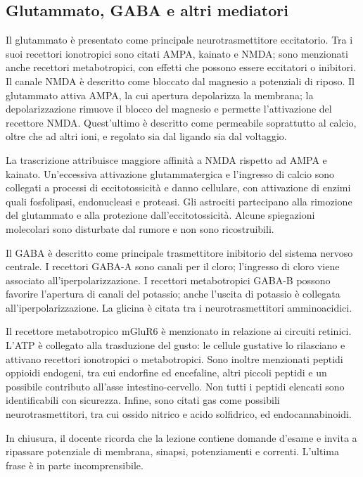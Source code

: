 \subsection{Glutammato, GABA e altri mediatori}

Il glutammato è presentato come principale neurotrasmettitore eccitatorio. Tra i suoi recettori ionotropici sono citati AMPA, kainato e NMDA; sono menzionati anche recettori metabotropici, con effetti che possono essere eccitatori o inibitori. Il canale NMDA è descritto come bloccato dal magnesio a potenziali di riposo. Il glutammato attiva AMPA, la cui apertura depolarizza la membrana; la depolarizzazione rimuove il blocco del magnesio e permette l'attivazione del recettore NMDA. Quest'ultimo è descritto come permeabile soprattutto al calcio, oltre che ad altri ioni, e regolato sia dal ligando sia dal voltaggio.

La trascrizione attribuisce maggiore affinità a NMDA rispetto ad AMPA e kainato. Un'eccessiva attivazione glutammatergica e l'ingresso di calcio sono collegati a processi di eccitotossicità e danno cellulare, con attivazione di enzimi quali fosfolipasi, endonucleasi e proteasi. Gli astrociti partecipano alla rimozione del glutammato e alla protezione dall'eccitotossicità. Alcune spiegazioni molecolari sono disturbate dal rumore e non sono ricostruibili.

Il GABA è descritto come principale trasmettitore inibitorio del sistema nervoso centrale. I recettori GABA-A sono canali per il cloro; l'ingresso di cloro viene associato all'iperpolarizzazione. I recettori metabotropici GABA-B possono favorire l'apertura di canali del potassio; anche l'uscita di potassio è collegata all'iperpolarizzazione. La glicina è citata tra i neurotrasmettitori amminoacidici.

Il recettore metabotropico mGluR6 è menzionato in relazione ai circuiti retinici. L'ATP è collegato alla trasduzione del gusto: le cellule gustative lo rilasciano e attivano recettori ionotropici o metabotropici. Sono inoltre menzionati peptidi oppioidi endogeni, tra cui endorfine ed encefaline, altri piccoli peptidi e un possibile contributo all'asse intestino-cervello. Non tutti i peptidi elencati sono identificabili con sicurezza. Infine, sono citati gas come possibili neurotrasmettitori, tra cui ossido nitrico e acido solfidrico, ed endocannabinoidi.

In chiusura, il docente ricorda che la lezione contiene domande d'esame e invita a ripassare potenziale di membrana, sinapsi, potenziamenti e correnti. L'ultima frase è in parte incomprensibile.

